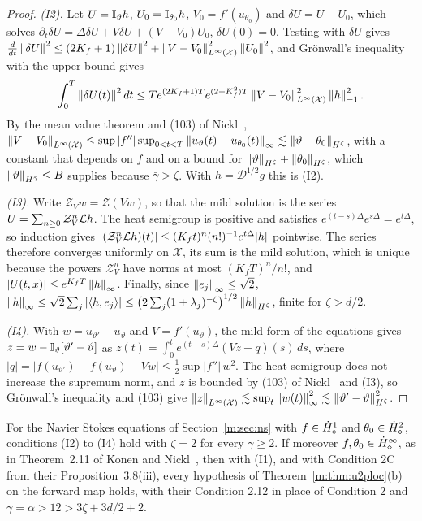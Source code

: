 \begin{proof}
\emph{(I2).} Let $U=\mathbb{I}_\vartheta h$, $U_0=\mathbb{I}_{\theta_0}h$, $V_0=f'(u_{\theta_0})$ and $\delta U=U-U_0$, which solves $\partial_t\delta U=\Delta\delta U+V\delta U+(V-V_0)U_0$, $\delta U(0)=0$. Testing with $\delta U$ gives $\tfrac d{dt}\left\|\delta U\right\|^2\le(2K_f+1)\left\|\delta U\right\|^2+\left\|V-V_0\right\|^2_{L^\infty(\mathcal X)}\left\|U_0\right\|^2$, and Gr\"onwall's inequality with the upper bound gives
\[
\int_0^T\left\|\delta U(t)\right\|^2dt\le Te^{(2K_f+1)T}e^{(2+K_f^2)T}\left\|V-V_0\right\|^2_{L^\infty(\mathcal X)}\left\|h\right\|^2_{-1} .
\]
By the mean value theorem and (103) of Nickl~\cite{nicklbvm2024}, $\left\|V-V_0\right\|_{L^\infty(\mathcal X)}\le\sup|f''|\sup_{0<t<T}\left\|u_\vartheta(t)-u_{\theta_0}(t)\right\|_\infty\lesssim\left\|\vartheta-\theta_0\right\|_{H^\zeta}$, with a constant that depends on $f$ and on a bound for $\left\|\vartheta\right\|_{H^\zeta}+\left\|\theta_0\right\|_{H^\zeta}$, which $\left\|\vartheta\right\|_{H^{\bar\gamma}}\le B$ supplies because $\bar\gamma>\zeta$. With $h=\mathcal D^{1/2}g$ this is (I2).

\emph{(I3).} Write $\mathcal Z_Vw=\mathcal Z(Vw)$, so that the mild solution is the series $U=\sum_{n\ge0}\mathcal Z_V^n\mathcal{L} h$. The heat semigroup is positive and satisfies $e^{(t-s)\Delta}e^{s\Delta}=e^{t\Delta}$, so induction gives $|(\mathcal Z_V^n\mathcal{L} h)(t)|\le(K_ft)^n(n!)^{-1}e^{t\Delta}|h|$ pointwise. The series therefore converges uniformly on $\mathcal X$, its sum is the mild solution, which is unique because the powers $\mathcal Z_V^n$ have norms at most $(K_fT)^n/n!$, and $|U(t,x)|\le e^{K_fT}\left\|h\right\|_\infty$. Finally, since $\left\|e_j\right\|_\infty\le\sqrt2$, $\left\|h\right\|_\infty\le\sqrt2\sum_j|\langle h,e_j\rangle|\le\big(2\sum_j(1+\lambda_j)^{-\zeta}\big)^{1/2}\left\|h\right\|_{H^\zeta}$, finite for $\zeta>d/2$.

\emph{(I4).} With $w=u_{\vartheta'}-u_\vartheta$ and $V=f'(u_\vartheta)$, the mild form of the equations gives $z=w-\mathbb{I}_\vartheta[\vartheta'-\vartheta]$ as $z(t)=\int_0^te^{(t-s)\Delta}(Vz+q)(s)\,ds$, where $|q|=|f(u_{\vartheta'})-f(u_\vartheta)-Vw|\le\frac12\sup|f''|\,w^2$. The heat semigroup does not increase the supremum norm, and $z$ is bounded by (103) of Nickl~\cite{nicklbvm2024} and (I3), so Gr\"onwall's inequality and (103) give $\left\|z\right\|_{L^\infty(\mathcal X)}\lesssim\sup_t\left\|w(t)\right\|^2_\infty\lesssim\left\|\vartheta'-\vartheta\right\|^2_{H^\zeta}$.
\end{proof}

\begin{lemma}\label{m:lem:nslin}
For the Navier Stokes equations of Section~\ref{m:sec:ns} with $f\in\dot H^{1}_\diamond$ and $\theta_0\in\dot H^{2}_\diamond$, conditions (I2) to (I4) hold with $\zeta=2$ for every $\bar\gamma\ge2$. If moreover $f,\theta_0\in\dot H^{\infty}_\diamond$, as in Theorem~2.11 of Konen and Nickl~\cite{konennickl2026}, then with (I1), and with Condition 2C from their Proposition~3.8(iii), every hypothesis of Theorem~\ref{m:thm:u2ploc}(b) on the forward map holds, with their Condition 2.12 in place of Condition 2 and $\gamma=\alpha>12>3\zeta+3d/2+2$.
\end{lemma}

